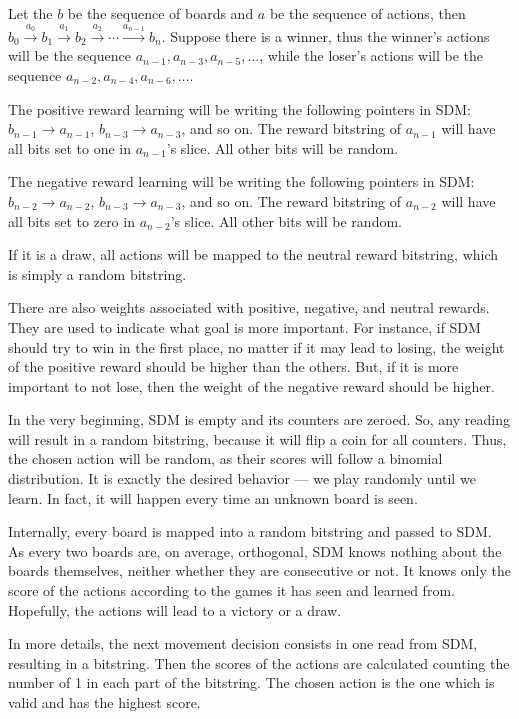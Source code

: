 Let the $b$ be the sequence of boards and $a$ be the sequence of actions, then $b_0 \xrightarrow{a_0} b_1 \xrightarrow{a_1} b_2 \xrightarrow{a_2} \cdots \xrightarrow{a_{n-1}} b_n$. Suppose there is a winner, thus the winner's actions will be the sequence $a_{n-1}, a_{n-3}, a_{n-5}, \dots$, while the loser's actions will be the sequence $a_{n-2}, a_{n-4}, a_{n-6}, \dots$.

The positive reward learning will be writing the following pointers in SDM: $b_{n-1} \rightarrow a_{n-1}$, $b_{n-3} \rightarrow a_{n-3}$, and so on. The reward bitstring of $a_{n-1}$ will have all bits set to one in $a_{n-1}$'s slice. All other bits will be random.

The negative reward learning will be writing the following pointers in SDM: $b_{n-2} \rightarrow a_{n-2}$, $b_{n-3} \rightarrow a_{n-3}$, and so on. The reward bitstring of $a_{n-2}$ will have all bits set to zero in $a_{n-2}$'s slice. All other bits will be random.

If it is a draw, all actions will be mapped to the neutral reward bitstring, which is simply a random bitstring.

There are also weights associated with positive, negative, and neutral rewards. They are used to indicate what goal is more important. For instance, if SDM should try to win in the first place, no matter if it may lead to losing, the weight of the positive reward should be higher than the others. But, if it is more important to not lose, then the weight of the negative reward should be higher.

In the very beginning, SDM is empty and its counters are zeroed. So, any reading will result in a random bitstring, because it will flip a coin for all counters. Thus, the chosen action will be random, as their scores will follow a binomial distribution. It is exactly the desired behavior --- we play randomly until we learn. In fact, it will happen every time an unknown board is seen.

Internally, every board is mapped into a random bitstring and passed to SDM. As every two boards are, on average, orthogonal, SDM knows nothing about the boards themselves, neither whether they are consecutive or not. It knows only the score of the actions according to the games it has seen and learned from. Hopefully, the actions will lead to a victory or a draw.

In more details, the next movement decision consists in one read from SDM, resulting in a bitstring. Then the scores of the actions are calculated counting the number of 1 in each part of the bitstring. The chosen action is the one which is valid and has the highest score.


